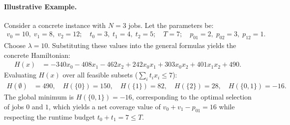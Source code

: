 \documentclass[12pt]{article}
\begin{document}
\paragraph{Illustrative Example.}
Consider a concrete instance with $N=3$ jobs. Let the parameters be:
\begin{align}
v_0 = 10, \; v_1 = 8, \; v_2 = 12; \quad t_0 = 3, \; t_1 = 4, \; t_2 = 5; \quad T = 7; \quad p_{01} = 2, \; p_{02} = 3, \; p_{12} = 1.
\end{align}
Choose $\lambda = 10$. Substituting these values into the general formulas yields the concrete Hamiltonian:
\begin{align}
H(x) &= -340 x_0 - 408 x_1 - 462 x_2 + 242 x_0 x_1 + 303 x_0 x_2 + 401 x_1 x_2 + 490.
\end{align}
Evaluating $H(x)$ over all feasible subsets ($\sum_i t_i x_i \le 7$):
\begin{align}
H(\emptyset) &= 490, \quad H(\{0\}) = 150, \quad H(\{1\}) = 82, \quad H(\{2\}) = 28, \quad H(\{0,1\}) = -16.
\end{align}
The global minimum is $H(\{0,1\}) = -16$, corresponding to the optimal selection of jobs $0$ and $1$, which yields a net coverage value of $v_0 + v_1 - p_{01} = 16$ while respecting the runtime budget $t_0 + t_1 = 7 \le T$.
\end{document}
